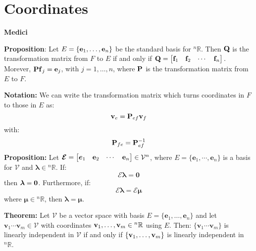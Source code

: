 \documentclass{article}
\begin{document}
    \section{Coordinates}
    \begin{minipage}[t]{.45\textwidth}
    \begin{center}
        \textbf{Medici}
    \end{center}
    \textbf{Proposition}: Let $E = \{\mathbf{e}_1, \dots, \mathbf{e}_n\}$ be the standard basis for ${^n}\mathbb{R}$. Then $\mathbf{Q}$ is the transformation matrix from $F$ to $E$ if and only if $\mathbf{Q} = \begin{bmatrix}
        \mathbf{f}_1 & \mathbf{f}_2 & \cdots & \mathbf{f}_n
    \end{bmatrix}.$ Morever, $\mathbf{Pf}_j = \mathbf{e}_j$, with $j=1,\dots,n$, where $\mathbf{P}$ is the transformation matrix from $E$ to $F$.
    \vspace{2mm}

    \textbf{Notation:} We can write the transformation matrix which turns coordinates in $F$ to those in $E$ as:
    \begin{equation*}
        \mathbf{v}_e = \mathbf{P}_{ef} \mathbf{v}_f
    \end{equation*}
    with:
    \begin{equation*}
        \mathbf{P}_{fe} = \mathbf{P}_{ef}^{-1}
    \end{equation*}
    \textbf{Proposition:} Let $\bm{\mathcal{E}} = \begin{bmatrix}
        \bm{e}_1 & \mathbf{e}_2 & \cdots & \mathbf{e}_n
    \end{bmatrix} \in \mathcal{V}^n$, where $E = \{\bm{e}_1, \cdots, \bm{e}_n\}$ is a basis for $\mathcal{V}$ and $\bm{\lambda} \in {^n}\mathbb{R}.$ If:
    \begin{equation*}
        \bm{\mathcal{E}\lambda}= \bm{0}
    \end{equation*}
    then $\bm{\lambda}=\mathbf{0}$. Furthermore, if:
    \begin{equation*}
        \bm{\mathcal{E}\lambda} = \bm{\mathcal{E}\mu}
    \end{equation*}
    where $\bm{\mu} \in {^n}\mathbb{R}$, then $\bm{\lambda}=\bm{\mu}.$
    \vspace{2mm}

    \textbf{Theorem:} Let $\mathcal{V}$ be a vector space with basis $E=\{\bm{e}_1, \dots, \bm{e}_n\}$ and let $\bm{v}_1 \cdots \bm{v}_m \in \mathcal{V}$ with coordinates $\mathbf{v}_1, \dots, \mathbf{v}_m \in {^n}\mathbb{R}$ using $E$. Then: $\{\bm{v}_1 \cdots \bm{v}_m\}$ is linearly independent in $\mathcal{V}$ if and only if $\{\mathbf{v}_1, \dots, \mathbf{v}_m\}$ is linearly independent in ${^n}\mathbb{R}$.
    \end{minipage}
\end{document}
